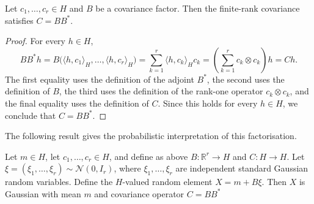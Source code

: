 \begin{proposition}\label{prop:Finite-rank covariance factorisation}
Let \(c_1,\ldots,c_r\in H\) and \(B\) be a covariance factor. Then the finite-rank covariance satisfies \(C=BB^*\).
\end{proposition}

\begin{proof}
For every \(h\in H\),
\[
BB^*h=B\bigl(\langle h,c_1\rangle_H,\ldots,\langle h,c_r\rangle_H\bigr)=\sum_{k=1}^r\langle h,c_k\rangle_Hc_k=\left(\sum_{k=1}^r c_k\otimes c_k\right)h=Ch.
\]
The first equality uses the definition of the adjoint \(B^*\), the second uses the definition of \(B\), the third uses the definition of the rank-one operator \(c_k\otimes c_k\), and the final equality uses the definition of \(C\). Since this holds for every \(h\in H\), we conclude that \(C=BB^*\).
\end{proof}

The following result gives the probabilistic interpretation of this factorisation.

\begin{theorem}\label{thm:Finite-rank Gaussian construction}
Let \(m\in H\), let \(c_1,\ldots,c_r\in H\), and define as above \(B:\mathbb R^r\to H\) and \(C:H\to H\). Let \(\xi=(\xi_1,\ldots,\xi_r)\sim\mathcal N(0,I_r)\), where \(\xi_1,\ldots,\xi_r\) are independent standard Gaussian random variables. Define the \(H\)-valued random element \(X=m+B\xi\). Then \(X\) is Gaussian with mean \(m\) and covariance operator \(C=BB^*\)
\end{theorem}


